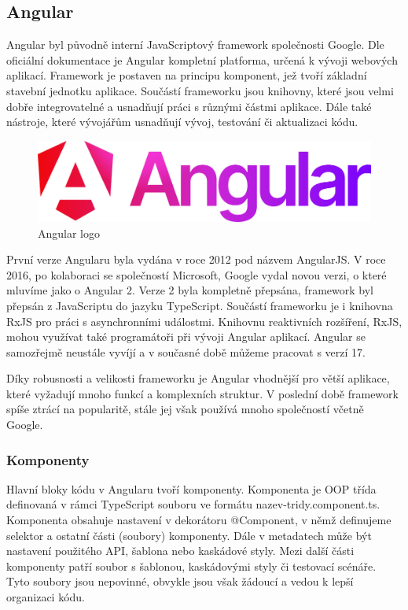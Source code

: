 \subsection{Angular}

Angular byl původně interní JavaScriptový framework společnosti Google. 
Dle oficiální dokumentace \cite{angulario} je Angular kompletní platforma, určená k vývoji webových aplikací. 
Framework je postaven na principu komponent, jež tvoří základní stavební jednotku aplikace. 
Součástí frameworku jsou knihovny, které jsou velmi dobře integrovatelné a usnadňují práci s různými částmi aplikace. 
Dále také nástroje, které vývojářům usnadňují vývoj, testování či aktualizaci kódu.\cite{angulario,learningangular}

\begin{figure}[htb]
	\centering
		\includegraphics[width=.5\textwidth]{images/angular-logo.png}
	\caption[Angular logo]{Angular logo \cite{angulardev}}
	\label{fig:angularlogo}
\end{figure}

První verze Angularu byla vydána v roce 2012 pod názvem AngularJS. 
V roce 2016, po kolaboraci se společností Microsoft, Google vydal novou verzi, o které mluvíme jako o Angular 2. 
Verze 2 byla kompletně přepsána, framework byl přepsán z JavaScriptu do jazyku TypeScript. 
Součástí frameworku je i knihovna RxJS pro práci s asynchronními událostmi. 
Knihovnu reaktivních rozšíření, RxJS, mohou využívat také programátoři při vývoji Angular aplikací. 
Angular se samozřejmě neustále vyvíjí a v současné době můžeme pracovat s verzí 17.\cite{angulardev,learningangular}

Díky robusnosti a velikosti frameworku je Angular vhodnější pro větší aplikace, které vyžadují mnoho funkcí a komplexních struktur. 
V poslední době framework spíše ztrácí na popularitě, stále jej však používá mnoho společností včetně Google.\cite{learningangular}

\subsubsection{Komponenty}

Hlavní bloky kódu v Angularu tvoří komponenty. Komponenta je OOP třída definovaná v rámci TypeScript souboru ve formátu nazev-tridy.component.ts. 
Komponenta obsahuje nastavení v dekorátoru @Component, v němž definujeme selektor a ostatní části (soubory) komponenty. 
Dále v metadatech může být nastavení použitého API, šablona nebo kaskádové styly. 
Mezi další části komponenty patří soubor s šablonou, kaskádovými styly či testovací scénáře. 
Tyto soubory jsou nepovinné, obvykle jsou však žádoucí a vedou k lepší organizaci kódu. 


